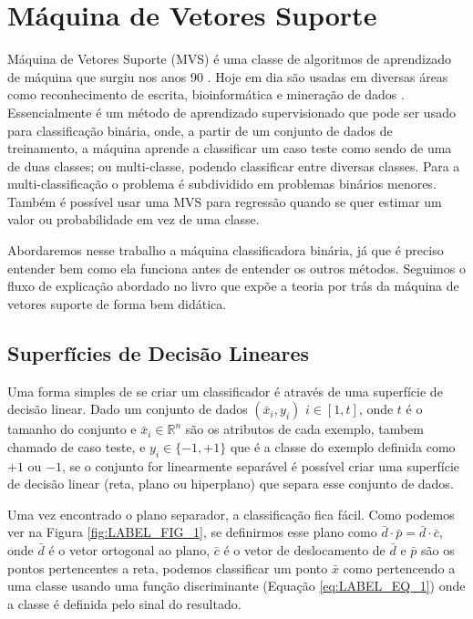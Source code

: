 \chapter{Máquina de Vetores Suporte}\label{chp:LABEL_CHP_2}


Máquina de Vetores Suporte (MVS) é uma classe de algoritmos de aprendizado de máquina que surgiu nos anos 90 \cite{cortes1995support}. Hoje em dia são usadas em diversas áreas como reconhecimento de escrita, bioinformática e mineração de dados \cite{defilippo2004maquinas}. Essencialmente é um método de aprendizado supervisionado que pode ser usado para classificação binária, onde, a partir de um conjunto de dados de treinamento, a máquina aprende a classificar um caso teste como sendo de uma de duas classes; ou multi-classe, podendo classificar entre diversas classes. Para a multi-classificação o problema é subdividido em problemas binários menores. Também é possível usar uma MVS para regressão quando se quer estimar um valor ou probabilidade em vez de uma classe. 

Abordaremos nesse trabalho a máquina classificadora binária, já que é preciso entender bem como ela funciona antes de entender os outros métodos. Seguimos o fluxo de explicação abordado no livro \cite{art:LIVRO_SVM} que expõe a teoria por trás da máquina de vetores suporte de forma bem didática.

\section{Superfícies de Decisão Lineares}
Uma forma simples de se criar um classificador é através de uma superfície de decisão linear. Dado um conjunto de dados $(\bar{x}_i,y_i)$ $i\in[1,t]$, onde $t$ é o tamanho do conjunto e $\bar{x}_i \in \mathbb{R}^n$ são os atributos de cada exemplo, tambem chamado de caso teste, e $y_i \in \{ -1,+1 \}$ que é a classe do exemplo definida como $+1$ ou $-1$, se o conjunto for linearmente separável é possível criar uma superfície de decisão linear (reta, plano ou hiperplano) que separa esse conjunto de dados.

Uma vez encontrado o plano separador, a classificação fica fácil. Como podemos ver na Figura \ref{fig:LABEL_FIG_1}, se definirmos esse plano como $\bar{d}\cdot \bar{p} = \bar{d}\cdot \bar{c}$, onde $\bar{d}$ é o vetor ortogonal ao plano, $\bar{c}$ é o vetor de deslocamento de $\bar{d}$ e $\bar{p}$ são os pontos pertencentes a reta, podemos classificar um ponto $\bar{x}$ como pertencendo a uma classe usando uma função discriminante (Equação \ref{eq:LABEL_EQ_1}) onde a classe é definida pelo sinal do resultado.

